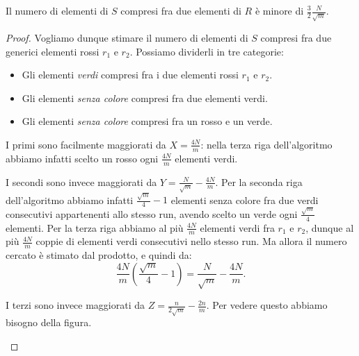 \begin{lemma}[Correttezza]
    Il numero di elementi di \(S\) compresi fra due elementi di \(R\) \`e
    minore di \(\frac{3}{2}\frac{N}{\sqrt{m}}\).
\end{lemma}
\begin{proof}
    Vogliamo dunque stimare il numero di elementi di \(S\) compresi fra
    due generici elementi rossi \(r_1\) e \(r_2\). Possiamo dividerli in
    tre categorie:
    \begin{itemize}
        \item Gli elementi \emph{verdi} compresi fra i due elementi rossi \(r_1\) e \(r_2\).
        \item Gli elementi \emph{senza colore} compresi fra due elementi verdi.
        \item Gli elementi \emph{senza colore} compresi fra un rosso e un verde.
    \end{itemize}
        
    I primi sono facilmente maggiorati da \(X = \frac{4N}{m}\): nella 
    terza riga dell'algoritmo abbiamo infatti scelto un rosso ogni 
    \(\frac{4N}{m}\) elementi verdi.
        
    I secondi sono invece maggiorati da \(Y = \frac{N}{\sqrt{m}} - \frac{4N}{m}\). Per la seconda riga dell'algoritmo abbiamo infatti 
    \(\frac{\sqrt{m}}{4}-1\) elementi senza colore fra due verdi
    consecutivi appartenenti allo stesso run, avendo scelto un verde ogni
    \(\frac{\sqrt{m}}{4}\) elementi. Per la terza riga abbiamo al pi\`u
    \(\frac{4N}{m}\) elementi verdi fra \(r_1\) e \(r_2\), dunque al
    pi\`u \(\frac{4N}{m}\) coppie di elementi verdi consecutivi nello
    stesso run. Ma allora il numero cercato \`e stimato dal prodotto, e 
    quindi da:
    \[
        \frac{4N}{m}\left(\frac{\sqrt{m}}{4}-1\right) = \frac{N}{\sqrt{m}} - \frac{4N}{m}\mbox{.}
    \]
        
    I terzi sono invece maggiorati da \(Z = \frac{n}{2\sqrt{m}} - \frac{2n}{m}\). Per vedere questo abbiamo bisogno della figura.
    \begin{figure}
        \centering
\end{figure}
\end{proof}

